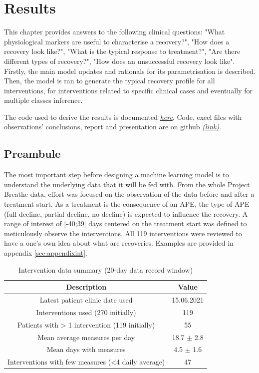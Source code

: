 \chapter{Results}
This chapter provides answers to the following clinical questions: "What physiological markers are useful to characterise a recovery?", "How does a recovery look like?", "What is the typical response to treatment?", "Are there different types of recovery?", "How does an unsuccessful recovery look like". Firstly, the main model updates and rationals for its parametrisation is described. Then, the model is ran to generate the typical recovery profile for all interventions, for interventions related to specific clinical cases and eventually for multiple classes inference. 

The code used to derive the results is documented \href{https://tristantreb.github.io/master_thesis_CF_ML/}{\textit{here}}. Code, excel files with observations' conclusions, report and presentation are on github \href{https://github.com/tristantreb/pdm}{\textit{(link)}}.

\section{Preambule}
The most important step before designing a machine learning model is to understand the underlying data that it will be fed with. From the whole Project Breathe data, effort was focused on the observation of the data before and after a treatment start. As a treatment is the consequence of an APE, the type of APE (full decline, partial decline, no decline) is expected to influence the recovery. A range of interest of [-40;39] days centered on the treatment start was defined to meticulously observe the interventions. All 119 interventions were reviewed to have a one's own idea about what are recoveries. Examples are provided in appendix \ref{sec:appendixint}.

    \begin{table}[H]
        \centering
        \begin{tabular}{c|c}
         \hline
        \textbf{Description} & \textbf{Value}  \\
        \hline
        Latest patient clinic date used & 15.06.2021 \\
        Interventions used (270 initially) & 119 \\
        Patients with > 1 intervention (119 initially) & 55 \\
        Mean average measures per day & 18.7 $\pm$ 2.8 \\
        Mean days with measures & 4.5 $\pm$ 1.6 \\
        Interventions with few measures (<4 daily average) & 47 \\
        \hline
        \end{tabular}
        \caption{Intervention data summary (20-day data record window)}
        \label{tab:intrdata}
    \end{table}

